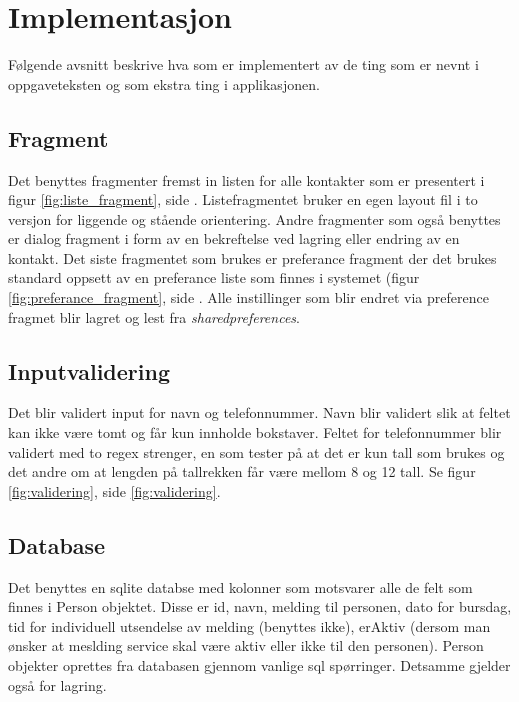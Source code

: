 \chapter{Implementasjon}

Følgende avsnitt beskrive hva som er implementert av de ting som er nevnt i oppgaveteksten og som ekstra ting i applikasjonen. 

\section{Fragment}
Det benyttes fragmenter fremst in listen for alle kontakter som er presentert i figur \ref{fig:liste_fragment}, side \pageref{fig:liste_fragment}. Listefragmentet bruker en egen layout fil i to versjon for liggende og stående orientering.
Andre fragmenter som også benyttes er dialog fragment i form av en bekreftelse ved lagring eller endring av en kontakt. 
Det siste fragmentet som brukes er preferance fragment der det brukes standard oppsett av en preferance liste som finnes i systemet (figur \ref{fig:preferance_fragment}, side \pageref{fig:preferance_fragment}. 
Alle instillinger som blir endret via preference fragmet blir lagret og lest fra \textit{sharedpreferences}.

\section{Inputvalidering}
Det blir validert input for navn og telefonnummer. Navn blir validert slik at feltet kan ikke være tomt og får kun innholde bokstaver. 
Feltet for telefonnummer blir validert med to regex strenger, en som tester på at det er kun tall som brukes og det andre om at lengden på tallrekken får være mellom 8 og 12 tall. Se figur \ref{fig:validering}, side \ref{fig:validering}.

\section{Database}
Det benyttes en sqlite databse med kolonner som motsvarer alle de felt som finnes i Person objektet. Disse er id, navn, melding til personen, dato for bursdag, tid for individuell utsendelse av melding (benyttes ikke), erAktiv (dersom man ønsker at meslding service skal være aktiv eller ikke til den personen). Person objekter oprettes fra databasen gjennom vanlige sql spørringer. Detsamme gjelder også for lagring. 


